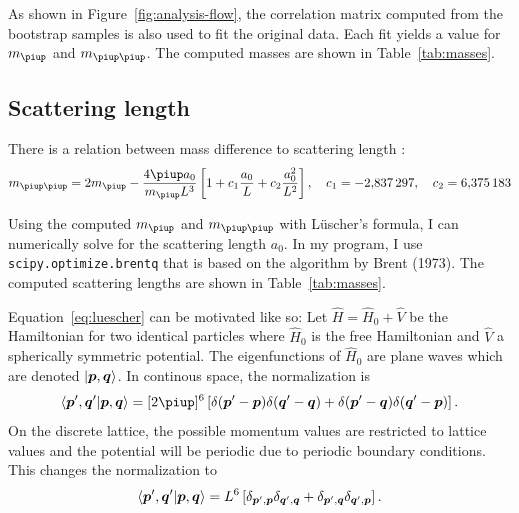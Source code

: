 \documentclass[11pt, english, fleqn, DIV=10, headinclude]{scrartcl}
\newcommand\mpi{m_{\piup}}
\newcommand\mpipi{m_{\piup\piup}}
\begin{document}
As shown in Figure~\ref{fig:analysis-flow}, the correlation matrix computed from
the bootstrap samples is also used to fit the original data. Each fit yields a
value for $\mpi$ and $\mpipi$. The computed masses are shown in
Table~\ref{tab:masses}.

\subsection{Scattering length}
\label{sec:scattering_length}

There is a relation between mass difference to scattering length
\parencite[(1.3)]{luescher/volume_dependence}:
\begin{equation}
    \label{eq:luescher}
    \mpipi = 2\mpi - \frac{4 \piup a_0}{\mpi L^3} \sbr{1 + c_1 \frac{a_0}L + c_2 \frac{a_0^2}{L^2}}
    \eqnsep
    c_1 = \num{-2.837297}
    \eqnsep
    c_2 = \num{6.375183}
\end{equation}

Using the computed $\mpi$ and $\mpipi$ with Lüscher's formula, I can
numerically solve for the scattering length $a_0$. In my program, I use
\texttt{scipy.optimize.brentq} that is based on the algorithm by Brent (1973).
The computed scattering lengths are shown in Table~\ref{tab:masses}.

Equation~\eqref{eq:luescher} can be motivated like so: Let $\hat H = \hat H_0 +
\hat V$ be the Hamiltonian for two identical particles where $\hat H_0$ is the
free Hamiltonian and $\hat V$ a spherically symmetric potential. The
eigenfunctions of $\hat H_0$ are plane waves which are denoted $\ket{\boldsymbol{p},
\boldsymbol{q}}$. In continous space, the normalization is
\parencite[(2.10)]{luescher/volume_dependence}
\[
    \braket{\vec p', \vec q'|\vec p, \vec q}
    = [2\piup]^6 \sbr{
        \delta(\vec p' - \vec p)
        \delta(\vec q' - \vec q)
        +
        \delta(\vec p' - \vec q)
        \delta(\vec q' - \vec p)
    }.
\]
On the discrete lattice, the possible momentum values are restricted to lattice
values and the potential will be periodic due to periodic boundary conditions.
This changes the normalization to
\parencite[(2.21)]{luescher/volume_dependence}
\[
    \braket{\boldsymbol{p}', \boldsymbol{q}'|\boldsymbol{p}, \boldsymbol{q}}
    = L^6 \left[ 
        \delta_{\boldsymbol{p}', \boldsymbol{p}}
        \delta_{\boldsymbol{q}', \boldsymbol{q}}
        +
        \delta_{\boldsymbol{p}', \boldsymbol{q}}
        \delta_{\boldsymbol{q}', \boldsymbol{p}}
     \right].
\]
\end{document}
